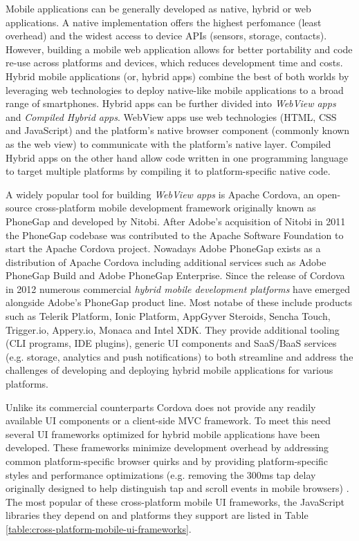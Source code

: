 \documentclass[thesis.tex]{subfiles}
\begin{document}
Mobile applications can be generally developed as native, hybrid or web applications. A native implementation offers the highest perfomance (least overhead) and the widest access to device APIs (sensors, storage, contacts). However, building a mobile web application allows for better portability and code re-use across platforms and devices, which reduces development time and costs. Hybrid mobile applications (or, hybrid apps) combine the best of both worlds by leveraging web technologies to deploy native-like mobile applications to a broad range of smartphones. Hybrid apps can be further divided into \textit{WebView apps} and \textit{Compiled Hybrid apps}. WebView apps use web technologies (HTML, CSS and JavaScript) and the platform's native browser component (commonly known as the web view) to communicate with the platform's native layer. Compiled Hybrid apps on the other hand allow code written in one programming language to target multiple platforms by compiling it to platform-specific native code.

A widely popular tool for building \textit{WebView apps} is Apache Cordova, an open-source cross-platform mobile development framework originally known as PhoneGap and developed by Nitobi. After Adobe's acquisition of Nitobi in 2011 the PhoneGap codebase was contributed to the Apache Software Foundation to start the Apache Cordova project. Nowadays Adobe PhoneGap exists as a distribution of Apache Cordova including additional services such as Adobe PhoneGap Build and Adobe PhoneGap Enterprise. Since the release of Cordova in 2012 numerous commercial \textit{hybrid mobile development platforms} have emerged alongside Adobe's PhoneGap product line. Most notabe of these include products such as Telerik Platform, Ionic Platform, AppGyver Steroids, Sencha Touch, Trigger.io, Appery.io, Monaca and Intel XDK. They provide additional tooling (CLI programs, IDE plugins), generic UI components and SaaS/BaaS services (e.g. storage, analytics and push notifications) to both streamline and address the challenges of developing and deploying hybrid mobile applications for various platforms.

Unlike its commercial counterparts Cordova does not provide any readily available UI components or a client-side MVC framework. To meet this need several UI frameworks optimized for hybrid mobile applications have been developed. These frameworks minimize development overhead by addressing common platform-specific browser quirks and by providing platform-specific styles and performance optimizations (e.g. removing the 300ms tap delay originally designed to help distinguish tap and scroll events in mobile browsers) \cite{click_delay}. The most popular of these cross-platform mobile UI frameworks, the JavaScript libraries they depend on and platforms they support are listed in Table \ref{table:cross-platform-mobile-ui-frameworks}.
\end{document}
